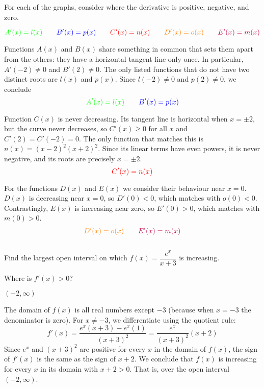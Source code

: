 \begin{hint}
For each of the graphs, consider where the derivative is positive, negative, and zero.
\end{hint}
\begin{answer}
$\textcolor{green}{A'(x)=l(x)} \qquad \textcolor{blue}{B'(x)=p(x)}
\qquad
\textcolor{red}{C'(x)=n(x)}
\qquad
\textcolor{orange}{D'(x)=o(x)}\qquad \textcolor{purple}{E'(x)=m(x)}$
\end{answer}
\begin{solution}
Functions $A(x)$ and $B(x)$ share something in common that sets them apart from the others: they have a horizontal tangent line only once. In particular, $A'(-2) \neq 0$ and $B'(2) \neq 0$. The only listed functions that do not have two distinct roots are $l(x)$ and $p(x)$. Since $l(-2) \neq 0$ and $p(2) \neq 0$, we conclude
\[\textcolor{green}{A'(x)=l(x)} \qquad \textcolor{blue}{B'(x)=p(x)}\]

Function $C(x)$ is never decreasing. Its tangent line is horizontal when $x = \pm 2$, but the curve never decreases, so $C'(x) \geq 0$ for all $x$ and $C'(2)=C'(-2)=0$. The only function that matches this is $n(x)=(x-2)^2(x+2)^2$. Since its linear terms have even powers, it is never negative, and its roots are precisely $x=\pm 2$.
\[\textcolor{red}{C'(x)=n(x)}\]

For the functions $D(x)$ and $E(x)$ we consider their behaviour
          near $x=0$.  $D(x)$ is decreasing near $x=0$, so $D'(0)<0$, which matches with $o(0)<0$. Contrastingly, $E(x)$ is increasing near zero, so
          $E'(0)>0$, which matches with $m(0)>0$.
\[\textcolor{orange}{D'(x)=o(x)}\qquad \textcolor{purple}{E'(x)=m(x)}\]
\end{solution}


\subsection*{\Procedural}


\begin{question}[2015Q]
Find the largest open interval on which $f(x)=\dfrac{e^x}{x+3}$ is increasing.
\end{question}
\begin{hint}
Where is $f'(x)>0$?
\end{hint}
\begin{answer}
$(-2,\infty)$
\end{answer}
\begin{solution}
The domain of $f(x)$ is all real numbers except $-3$ (because when $x=-3$ the denominator is zero). For $x\neq -3$, we differentiate using the quotient rule:
$$
f'(x)=\frac{e^x(x+3) - e^x(1)}{(x+3)^2} = \frac{e^x}{(x+3)^2} (x+2)
$$
Since $e^x$ and $(x+3)^2$ are  positive for every $x$ in the domain of $f(x)$, the sign of $f'(x)$ is the same as the sign of $x+2$. We conclude that $f(x)$
is increasing for every $x$ in its domain with $x+2>0$. That is, over the open interval $(-2,\infty)$.
\end{solution}



